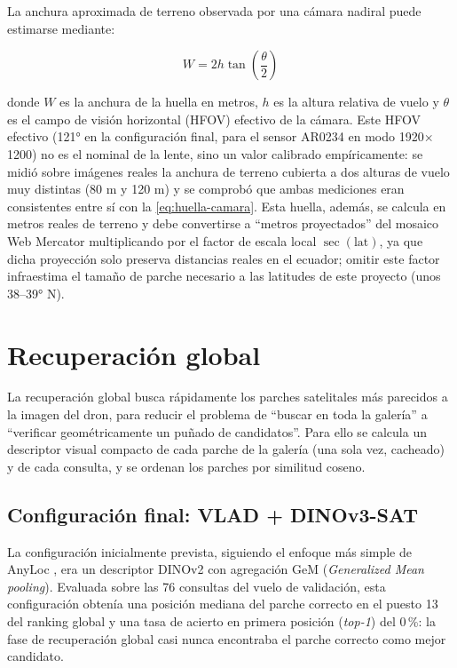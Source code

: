 La anchura aproximada de terreno observada por una cámara nadiral puede estimarse mediante:

\begin{equation}
W = 2h \tan\left(\frac{\theta}{2}\right)
\label{eq:huella-camara}
\end{equation}

\noindent donde $W$ es la anchura de la huella en metros, $h$ es la altura relativa de vuelo y $\theta$ es el campo de visión horizontal (HFOV) efectivo de la cámara. Este HFOV efectivo (\ang{121} en la configuración final, para el sensor AR0234 en modo 1920$\times$1200) no es el nominal de la lente, sino un valor calibrado empíricamente: se midió sobre imágenes reales la anchura de terreno cubierta a dos alturas de vuelo muy distintas (80 m y 120 m) y se comprobó que ambas mediciones eran consistentes entre sí con la \autoref{eq:huella-camara}. Esta huella, además, se calcula en metros reales de terreno y debe convertirse a \enquote{metros proyectados} del mosaico Web Mercator multiplicando por el factor de escala local $\sec(\mathrm{lat})$, ya que dicha proyección solo preserva distancias reales en el ecuador; omitir este factor infraestima el tamaño de parche necesario a las latitudes de este proyecto (unos 38--39° N).

\section{Recuperación global}
\label{sec:recuperacion-global}

La recuperación global busca rápidamente los parches satelitales más parecidos a la imagen del dron, para reducir el problema de \enquote{buscar en toda la galería} a \enquote{verificar geométricamente un puñado de candidatos}. Para ello se calcula un descriptor visual compacto de cada parche de la galería (una sola vez, cacheado) y de cada consulta, y se ordenan los parches por similitud coseno.

\subsection{Configuración final: VLAD + DINOv3-SAT}
\label{sec:recuperacion-global-final}

La configuración inicialmente prevista, siguiendo el enfoque más simple de AnyLoc \parencite{keetha2023anyloc}, era un descriptor DINOv2 con agregación GeM (\textit{Generalized Mean pooling}). Evaluada sobre las 76 consultas del vuelo de validación, esta configuración obtenía una posición mediana del parche correcto en el puesto 13 del ranking global y una tasa de acierto en primera posición (\textit{top-1}) del 0\,\%: la fase de recuperación global casi nunca encontraba el parche correcto como mejor candidato.

